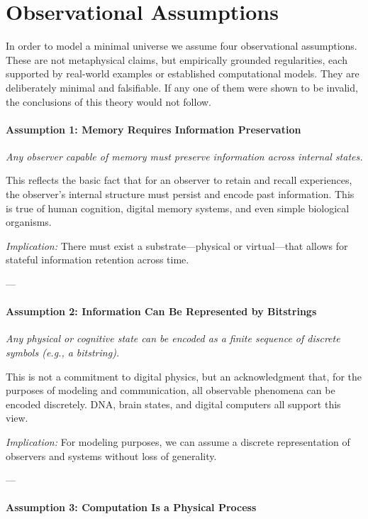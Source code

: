 \documentclass[12pt]{article}
\begin{document}
\section{Observational Assumptions}

In order to model a minimal universe we assume four observational assumptions. These are not metaphysical claims, but empirically grounded regularities, each supported by real-world examples or established computational models. They are deliberately minimal and falsifiable. If any one of them were shown to be invalid, the conclusions of this theory would not follow.

\paragraph{Assumption 1: Memory Requires Information Preservation}

\emph{Any observer capable of memory must preserve information across internal states.}

\vspace{0.2em}
This reflects the basic fact that for an observer to retain and recall experiences, the observer's internal structure must persist and encode past information. This is true of human cognition, digital memory systems, and even simple biological organisms.

\emph{Implication:} There must exist a substrate—physical or virtual—that allows for stateful information retention across time.

---

\paragraph{Assumption 2: Information Can Be Represented by Bitstrings}

\emph{Any physical or cognitive state can be encoded as a finite sequence of discrete symbols (e.g., a bitstring).}

\vspace{0.2em}
This is not a commitment to digital physics, but an acknowledgment that, for the purposes of modeling and communication, all observable phenomena can be encoded discretely. DNA, brain states, and digital computers all support this view.

\emph{Implication:} For modeling purposes, we can assume a discrete representation of observers and systems without loss of generality.

---

\paragraph{Assumption 3: Computation Is a Physical Process}
\end{document}
